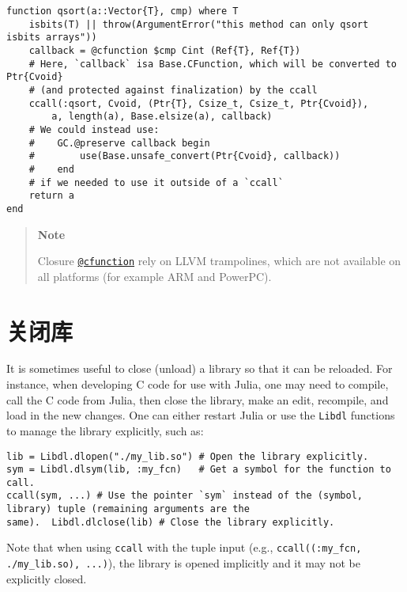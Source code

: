 \begin{verbatim}
function qsort(a::Vector{T}, cmp) where T
    isbits(T) || throw(ArgumentError("this method can only qsort isbits arrays"))
    callback = @cfunction $cmp Cint (Ref{T}, Ref{T})
    # Here, `callback` isa Base.CFunction, which will be converted to Ptr{Cvoid}
    # (and protected against finalization) by the ccall
    ccall(:qsort, Cvoid, (Ptr{T}, Csize_t, Csize_t, Ptr{Cvoid}),
        a, length(a), Base.elsize(a), callback)
    # We could instead use:
    #    GC.@preserve callback begin
    #        use(Base.unsafe_convert(Ptr{Cvoid}, callback))
    #    end
    # if we needed to use it outside of a `ccall`
    return a
end
\end{verbatim}



\begin{quote}
\textbf{Note}

Closure \hyperlink{11617107520401351255}{\texttt{@cfunction}} rely on LLVM trampolines, which are not available on all platforms (for example ARM and PowerPC).

\end{quote}


\hypertarget{10600174375111035081}{}


\section{关闭库}



It is sometimes useful to close (unload) a library so that it can be reloaded. For instance, when developing C code for use with Julia, one may need to compile, call the C code from Julia, then close the library, make an edit, recompile, and load in the new changes. One can either restart Julia or use the \texttt{Libdl} functions to manage the library explicitly, such as:




\begin{verbatim}
lib = Libdl.dlopen("./my_lib.so") # Open the library explicitly.
sym = Libdl.dlsym(lib, :my_fcn)   # Get a symbol for the function to call.
ccall(sym, ...) # Use the pointer `sym` instead of the (symbol, library) tuple (remaining arguments are the
same).  Libdl.dlclose(lib) # Close the library explicitly.
\end{verbatim}



Note that when using \texttt{ccall} with the tuple input (e.g., \texttt{ccall((:my\_fcn, {\textquotedbl}./my\_lib.so{\textquotedbl}), ...)}), the library is opened implicitly and it may not be explicitly closed.



